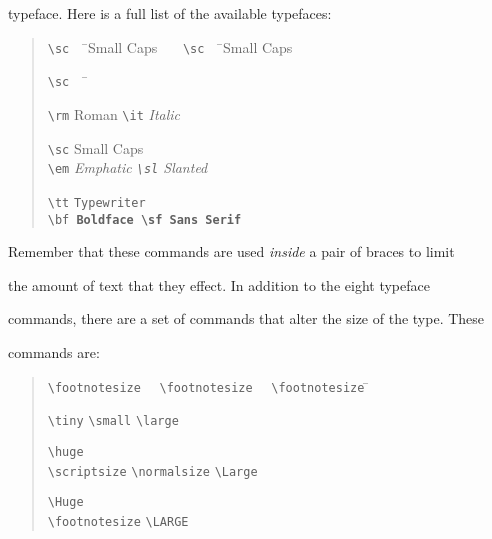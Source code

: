 typeface.  Here is a full list of the available typefaces:

\begin{quote}\begin{tabbing}

\verb|\sc|~~ \= \sc Small Caps~~~ \= \verb|\sc|~~ \= \sc Small Caps~~~

                                  \= \verb|\sc|~~ \=                   \kill

\verb|\rm|   \> \rm Roman         \> \verb|\it|   \> \it Italic

                                  \> \verb|\sc|   \> \sc Small Caps    \\

\verb|\em|   \> \em Emphatic      \> \verb|\sl| \> \sl Slanted

                                  \> \verb|\tt|   \> \tt Typewriter     \\

\verb|\bf|   \> \bf Boldface      \> \verb|\sf| \> \sf Sans Serif

\end{tabbing}\end{quote}



Remember that these commands are used {\em inside\/} a pair of braces to limit

the amount of text that they effect.  In addition to the eight typeface

commands, there are a set of commands that alter the size of the type.  These

commands are:

\begin{quotation}\begin{tabbing}

\verb|\footnotesize|~~ \= \verb|\footnotesize|~~ \= \verb|\footnotesize| \=

 \kill

\verb|\tiny|           \> \verb|\small|          \> \verb|\large|        \>

\verb|\huge|  \\

\verb|\scriptsize|     \> \verb|\normalsize|     \> \verb|\Large|        \>

\verb|\Huge|  \\

\verb|\footnotesize|   \>                        \> \verb|\LARGE|

\end{tabbing}\end{quotation}



